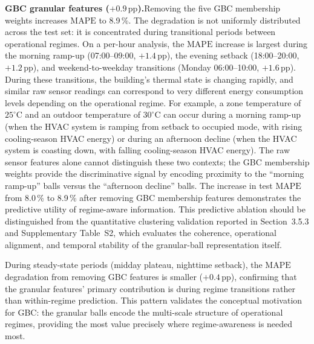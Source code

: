 \documentclass[11pt]{article}
\providecommand{\pp}{\,\text{pp}}
\providecommand{\MAPE}{\text{MAPE}}
\begin{document}
\par\noindent\hspace*{2em}\textbf{GBC granular features ($+0.9\pp$).}Removing the five GBC membership weights increases $\MAPE$ to 8.9\,\%. The degradation is not uniformly distributed across the test set: it is concentrated during transitional periods between operational regimes. On a per-hour analysis, the $\MAPE$ increase is largest during the morning ramp-up (07:00–09:00, $+1.4\pp$), the evening setback (18:00–20:00, $+1.2\pp$), and weekend-to-weekday transitions (Monday 06:00–10:00, $+1.6\pp$). During these transitions, the building's thermal state is changing rapidly, and similar raw sensor readings can correspond to very different energy consumption levels depending on the operational regime. For example, a zone temperature of $25^\circ\text{C}$ and an outdoor temperature of $30^\circ\text{C}$ can occur during a morning ramp-up (when the HVAC system is ramping from setback to occupied mode, with rising cooling-season HVAC energy) or during an afternoon decline (when the HVAC system is coasting down, with falling cooling-season HVAC energy). The raw sensor features alone cannot distinguish these two contexts; the GBC membership weights provide the discriminative signal by encoding proximity to the ``morning ramp-up'' balls versus the ``afternoon decline'' balls. The increase in test $\MAPE$ from 8.0\,\% to 8.9\,\% after removing GBC membership features demonstrates the predictive utility of regime-aware information. This predictive ablation should be distinguished from the quantitative clustering validation reported in Section~3.5.3 and Supplementary Table~S2, which evaluates the coherence, operational alignment, and temporal stability of the granular-ball representation itself.

During steady-state periods (midday plateau, nighttime setback), the $\MAPE$ degradation from removing GBC features is smaller ($+0.4\pp$), confirming that the granular features' primary contribution is during regime transitions rather than within-regime prediction. This pattern validates the conceptual motivation for GBC: the granular balls encode the multi-scale structure of operational regimes, providing the most value precisely where regime-awareness is needed most.
\end{document}
